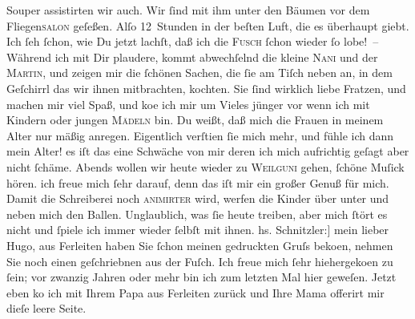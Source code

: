 \begin{ledgroupsized}[t]{13cm}
{                  Souper assistirten} wir auch. Wir ſind mit ihm unter den Bäumen vor dem
                  Fliegen\textsc{salon} geſeßen. Alſo 12 Stunden in der beſten
               Luft, die es überhaupt giebt. Ich ſeh ſchon, wie Du jetzt lachſt, daß ich die \textsc{Fusch} ſchon wieder ſo lobe! –\pend
           \pstart
           Während ich mit Dir plaudere, kommt abwechſelnd die kleine \textsc{Nani} und der \textsc{Martin}, und zeigen mir die ſchönen Sachen, die ſie am Tiſch neben an, in dem Geſchirrl
               das {\pb}wir ihnen mitbrachten, kochten. Sie ſind wirklich
               liebe Fratzen, und machen mir viel Spaß, und ko{\geminationm}e ich
               mir um Vieles jünger vor wenn ich mit Kindern oder jungen \textsc{Mädeln} bin. Du weißt, daß mich die Frauen in meinem Alter nur mäßig anregen.
               Eigentlich verſti{\geminationm}en ſie mich mehr, und fühle ich dann
               mein Alter! es iſt das eine Schwäche von mir deren ich mich aufrichtig geſagt aber
               nicht ſchäme.\pend
           \pstart
           Abends wollen wir heute wieder zu \textsc{Weilguni} gehen, ſchöne Muſick hören. ich freue mich ſehr darauf, denn das iſt mir ein
               großer Genuß für mich.\pend
           \pstart
           Damit die Schreiberei noch \textsc{animirter} wird, werfen die
               Kinder über unter und neben mich den Ballen. Unglaublich, was ſie heute treiben, aber
               mich ſtört es nicht und ſpiele ich immer wieder ſelbſt mit ihnen. \pend
           {\bigskip}\pstart
           \noindent{}{\pb}{[}hs. Schnitzler:{]} mein lieber Hugo, aus Ferleiten haben Sie ſchon meinen gedruckten Gruſs beko{\geminationm}en, nehmen Sie noch einen geſchriebnen aus der Fuſch. Ich freue mich ſehr hiehergeko{\geminationm}en zu ſein; vor zwanzig Jahren oder mehr bin ich zum
               letzten Mal hier geweſen. Jetzt eben ko{\geminationm} ich mit Ihrem
                  Papa aus Ferleiten zurück und Ihre Mama offerirt mir dieſe leere Seite.

\end{ledgroupsized}
